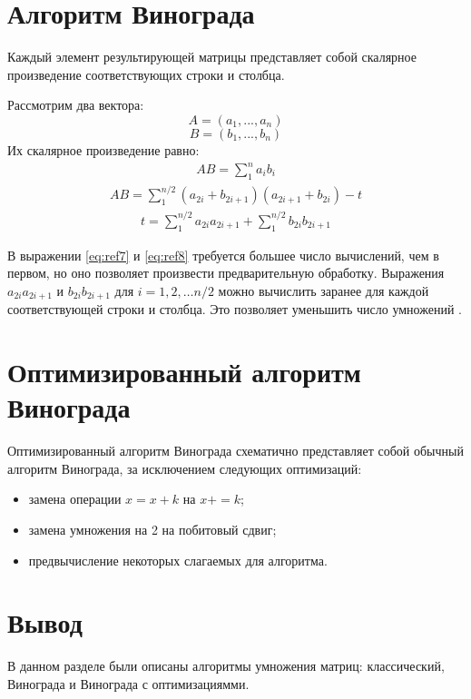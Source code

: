 \section{Алгоритм Винограда}

Каждый элемент результирующей матрицы представляет собой скалярное произведение соответствующих строки и столбца.

Рассмотрим два вектора:
\begin{equation}
	A = (a_{1},..., a_{n})
	\label{eq:ref4}
\end{equation}
\begin{equation}
	B = (b_{1},..., b_{n})
	\label{eq:ref5}
\end{equation}
Их скалярное произведение равно:
\begin{equation}
	\begin{array}{cc}
		AB = \sum\limits_{1}^n a_{i}b_{i}
	\end{array}
	\label{eq:ref6}
\end{equation}
\begin{equation}
	\begin{array}{cc}
		AB = \sum\limits_{1}^{n/2} (a_{2i} + b_{2i+1})(a_{2i+1} + b_{2i})-t
	\end{array}
	\label{eq:ref7}
\end{equation}
\begin{equation}
	\begin{array}{cc}
		t = \sum\limits_{1}^{n/2} a_{2i}a_{2i+1} + \sum\limits_{1}^{n/2} b_{2i}b_{2i+1}
	\end{array}
	\label{eq:ref8}
\end{equation}

В выражении \ref{eq:ref7} и \ref{eq:ref8} требуется большее
число вычислений, чем в первом, но оно позволяет произвести предварительную обработку. Выражения $a_{2i}a_{2i+1}$ и $b_{2i}b_{2i+1}$ для $i=1,2,\dots n/2$ можно вычислить заранее для каждой соответствующей строки и столбца. Это позволяет уменьшить число умножений \cite{winograd}.

\section{Оптимизированный алгоритм Винограда}

Оптимизированный алгоритм Винограда схематично представляет собой обычный алгоритм Винограда, за исключением следующих оптимизаций:

\begin{itemize}
	\item замена операции $x=x+k$ на $x+=k$;
	\item замена умножения на 2 на побитовый сдвиг;
	\item предвычисление некоторых слагаемых для алгоритма.
\end{itemize}


\section*{Вывод}

В данном разделе были описаны алгоритмы умножения матриц: классический, Винограда и Винограда с оптимизациямми.